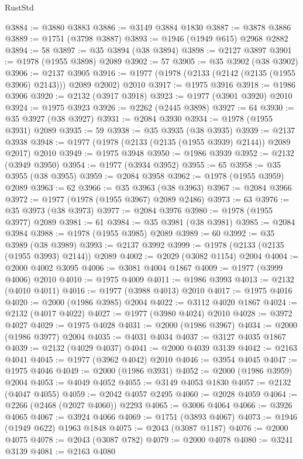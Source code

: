 \begin{lexlean}{RustStd}
\begin{coremodule}
{\begin{coremodule}
{{{{{{{{{{{{{{{{{{{{{{{{{{{{{{{@3884 := @3880 @3883
@3886 := @3149 @3884 @1830
@3887 := @3878 @3886
@3889 := @1751 (@3798 @3887)
@3893 := @1946 (@1949 @615) @2968 @2882
@3894 := 58
@3897 := @35 @3894 (@38 @3894)
@3898 := @2127 @3897
@3901 := @1978 (@1955 @3898) @2089
@3902 := 57
@3905 := @35 @3902 (@38 @3902)
@3906 := @2137 @3905
@3916 := @1977 (@1978 (@2133 (@2142 (@2135 (@1955 @3906) @2143))) @2089 @2002) @2010
@3917 := @1975 @3916
@3918 := @1986 @3906
@3920 := @2132 (@3917 @3918)
@3923 := @1977 (@3901 @3920) @2010
@3924 := @1975 @3923
@3926 := @2262 (@2445 @3898)
@3927 := 64
@3930 := @35 @3927 (@38 @3927)
@3931 := @2084 @3930
@3934 := @1978 (@1955 @3931) @2089
@3935 := 59
@3938 := @35 @3935 (@38 @3935)
@3939 := @2137 @3938
@3948 := @1977 (@1978 (@2133 (@2135 (@1955 @3939) @2144)) @2089 @2017) @2010
@3949 := @1975 @3948
@3950 := @1986 @3939
@3952 := @2132 (@3949 @3950)
@3954 := @1977 (@3934 @3952)
@3955 := 65
@3958 := @35 @3955 (@38 @3955)
@3959 := @2084 @3958
@3962 := @1978 (@1955 @3959) @2089
@3963 := 62
@3966 := @35 @3963 (@38 @3963)
@3967 := @2084 @3966
@3972 := @1977 (@1978 (@1955 @3967) @2089 @2486)
@3973 := 63
@3976 := @35 @3973 (@38 @3973)
@3977 := @2084 @3976
@3980 := @1978 (@1955 @3977) @2089
@3981 := 61
@3984 := @35 @3981 (@38 @3981)
@3985 := @2084 @3984
@3988 := @1978 (@1955 @3985) @2089
@3989 := 60
@3992 := @35 @3989 (@38 @3989)
@3993 := @2137 @3992
@3999 := @1978 (@2133 (@2135 (@1955 @3993) @2144)) @2089
@4002 := @2029 (@3082 @1154) @2004
@4004 := @2000 @4002 @3095
@4006 := @3081 @4004 @1867
@4009 := @1977 (@3999 @4006) @2010
@4010 := @1975 @4009
@4011 := @1986 @3993
@4013 := @2132 (@4010 @4011)
@4016 := @1977 (@3988 @4013) @2010
@4017 := @1975 @4016
@4020 := @2000 (@1986 @3985) @2004
@4022 := @3112 @4020 @1867
@4024 := @2132 (@4017 @4022)
@4027 := @1977 (@3980 @4024) @2010
@4028 := @3972 @4027
@4029 := @1975 @4028
@4031 := @2000 (@1986 @3967)
@4034 := @2000 (@1986 @3977) @2004
@4035 := @4031 @4034
@4037 := @3127 @4035 @1867
@4039 := @2132 (@4029 @4037)
@4041 := @2000 @4039 @3139
@4042 := @2163 @4041
@4045 := @1977 (@3962 @4042) @2010
@4046 := @3954 @4045
@4047 := @1975 @4046
@4049 := @2000 (@1986 @3931)
@4052 := @2000 (@1986 @3959) @2004
@4053 := @4049 @4052
@4055 := @3149 @4053 @1830
@4057 := @2132 (@4047 @4055)
@4059 := @2042 @4057 @2495
@4060 := @2028 @4059
@4064 := @2266 (@2468 (@2027 @4060)) @2293
@4065 := @3006 @4064
@4066 := @3926 @4065
@4067 := @3924 @4066
@4069 := @1751 (@3893 @4067)
@4073 := @1946 (@1949 @622) @1963 @1848
@4075 := @2043 (@3087 @1187)
@4076 := @2000 @4075
@4078 := @2043 (@3087 @782)
@4079 := @2000 @4078
@4080 := @3241 @3139
@4081 := @2163 @4080
}}}}}}}}}}}}}}}}}}}}}}}}}}}}}}}
\end{coremodule}}
\end{coremodule}
\end{lexlean}

